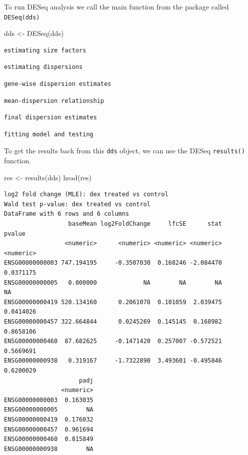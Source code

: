 \documentclass[
  letterpaper,
  DIV=11,
  numbers=noendperiod]{scrartcl}
\newenvironment{Shaded}{\begin{snugshade}}{\end{snugshade}}
\newcommand{\FunctionTok}[1]{\textcolor[rgb]{0.28,0.35,0.67}{#1}}
\newcommand{\NormalTok}[1]{\textcolor[rgb]{0.00,0.23,0.31}{#1}}
\newcommand{\OtherTok}[1]{\textcolor[rgb]{0.00,0.23,0.31}{#1}}
\begin{document}
To run DESeq analysis we call the main function from the package called
\texttt{DESeq(dds)}

\begin{Shaded}
\begin{Highlighting}[]
\NormalTok{dds }\OtherTok{\textless{}{-}} \FunctionTok{DESeq}\NormalTok{(dds)}
\end{Highlighting}
\end{Shaded}

\begin{verbatim}
estimating size factors
\end{verbatim}

\begin{verbatim}
estimating dispersions
\end{verbatim}

\begin{verbatim}
gene-wise dispersion estimates
\end{verbatim}

\begin{verbatim}
mean-dispersion relationship
\end{verbatim}

\begin{verbatim}
final dispersion estimates
\end{verbatim}

\begin{verbatim}
fitting model and testing
\end{verbatim}

To get the results back from this \texttt{dds} object, we can use the
DESeq \texttt{results()} function.

\begin{Shaded}
\begin{Highlighting}[]
\NormalTok{res }\OtherTok{\textless{}{-}} \FunctionTok{results}\NormalTok{(dds)}
\FunctionTok{head}\NormalTok{(res)}
\end{Highlighting}
\end{Shaded}

\begin{verbatim}
log2 fold change (MLE): dex treated vs control 
Wald test p-value: dex treated vs control 
DataFrame with 6 rows and 6 columns
                  baseMean log2FoldChange     lfcSE      stat    pvalue
                 <numeric>      <numeric> <numeric> <numeric> <numeric>
ENSG00000000003 747.194195     -0.3507030  0.168246 -2.084470 0.0371175
ENSG00000000005   0.000000             NA        NA        NA        NA
ENSG00000000419 520.134160      0.2061078  0.101059  2.039475 0.0414026
ENSG00000000457 322.664844      0.0245269  0.145145  0.168982 0.8658106
ENSG00000000460  87.682625     -0.1471420  0.257007 -0.572521 0.5669691
ENSG00000000938   0.319167     -1.7322890  3.493601 -0.495846 0.6200029
                     padj
                <numeric>
ENSG00000000003  0.163035
ENSG00000000005        NA
ENSG00000000419  0.176032
ENSG00000000457  0.961694
ENSG00000000460  0.815849
ENSG00000000938        NA
\end{verbatim}
\end{document}
